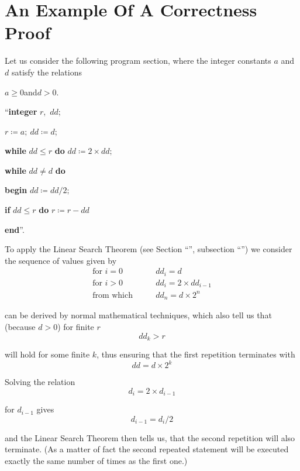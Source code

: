 \documentclass[twoside,11pt]{book}
\begin{document}
\section[An example of a correctness proof]{An Example Of A Correctness Proof}

Let us consider the following program section, where the integer constants $a$ and $d$ satisfy the relations
\medskip

{
	\setlength{\parindent}{8em}
	$a \geqslant 0$\quad and\quad $d > 0$.
	
	\hspace{-.4em}``\textbf{integer} $r$,\ $dd$;
	
	$r \coloneq a;\ dd \coloneq d$;
	
	\textbf{while} $dd \leqslant r$ \textbf{do} $dd \coloneq 2\times dd;$
	
	\textbf{while} $dd \neq d$ \textbf{do}
	
	\quad \textbf{begin} $dd \coloneq dd/2;$
	
	\quad\quad \textbf{if} $dd \leqslant r$ \textbf{do} $r \coloneq r - dd$
	
	\quad\textbf{end}''.
}
\medskip

To apply the Linear Search Theorem (see Section ``'', subsection ``'') we consider the sequence of values given by
\begin{equation}
	\label{eq:example-initial}
	\begin{split}
		\text{for } i = 0\qquad & dd_i = d \\
		\text{for } i > 0\qquad & dd_i = 2\times dd_{i - 1}\\
		\text{from which}\qquad & dd_n = d\times 2^n
	\end{split}
\end{equation}


\noindent
can be derived by normal mathematical techniques, which also tell us that (because $d > 0$) for finite $r$
$$
dd_k > r
$$

\noindent
will hold for some finite $k$, thus ensuring that the first repetition terminates with
$$
dd = d\times 2^k
$$

Solving the relation
$$
d_i = 2\times d_{i-1}
$$

\noindent
for $d_{i-1}$ gives
$$
d_{i-1} = d_i/2
$$

\noindent
and the Linear Search Theorem then tells us, that the second repetition will also terminate. (As a matter of fact the second repeated statement will be executed exactly the same number of times as the first one.)
\end{document}
